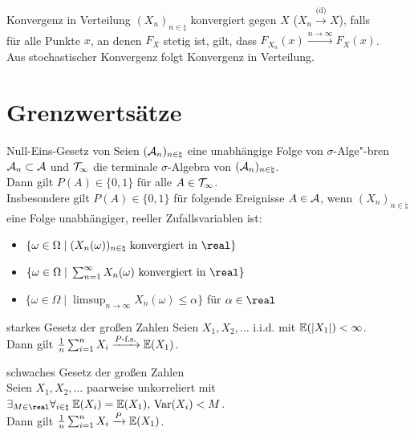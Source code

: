 \begin{Def}{Konvergenz in Verteilung}
    $(X_n)_{n \in \natural}$ konvergiert  gegen $X$
    ($X_n \xrightarrow{\text{(d)}} X$), falls\\
    für alle Punkte $x$, an denen $F_X$ stetig ist, gilt, dass
    $F_{X_n}(x) \xrightarrow{n \to \infty} F_X(x)$.\\
    Aus stochastischer Konvergenz folgt Konvergenz in Verteilung.
\end{Def}

\pagebreak

\section{%
    Grenzwertsätze%
}

\begin{Def}{Null-Eins-Gesetz von }
    Seien $(\mathcal{A}_n)_{n \in \natural}$ eine unabhängige Folge von $\sigma$-Alge"-bren $\mathcal{A}_n \subset \mathcal{A}$
    und $\mathcal{T}_\infty$ die terminale $\sigma$-Algebra von $(\mathcal{A}_n)_{n \in \natural}$.\\
    Dann gilt $P(A) \in \{0, 1\}$ für alle $A \in \mathcal{T}_\infty$.\\
    Insbesondere gilt $P(A) \in \{0, 1\}$ für folgende Ereignisse $A \in \mathcal{A}$,
    wenn $(X_n)_{n \in \natural}$ eine Folge unabhängiger, reeller Zufallsvariablen ist:
    \begin{itemize}
        \item
        $\{\omega \in \Omega \;|\; (X_n(\omega))_{n \in \natural} \text{ konvergiert in } \real\}$

        \item
        $\{\omega \in \Omega \;|\; \sum_{n=1}^\infty X_n(\omega) \text{ konvergiert in } \real\}$

        \item
        $\{\omega \in \Omega \;|\; \limsup_{n \to \infty} X_n(\omega) \le \alpha\}$
        für $\alpha \in \real$
    \end{itemize}
\end{Def}

\begin{Def}{starkes Gesetz der großen Zahlen}
    Seien $X_1, X_2, \dotsc$ i.i.d. mit $\mathbb{E}(|X_1|) < \infty$.\\
    Dann gilt $\frac{1}{n} \sum_{i=1}^n X_i \xrightarrow{P\text{-f.s.}} \mathbb{E}(X_1)$.
\end{Def}

\begin{Def}{schwaches Gesetz der großen Zahlen}\\
    Seien $X_1, X_2, \dotsc$ paarweise unkorreliert mit
    $\exists_{M \in \real} \forall_{i \in \natural}\;
    \EE(X_i) = \EE(X_1),\, \Var(X_i) < M$.\\
    Dann gilt $\frac{1}{n} \sum_{i=1}^n X_i \xrightarrow{P} \mathbb{E}(X_1)$.
\end{Def}

